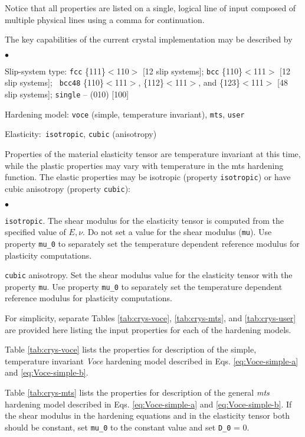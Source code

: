 \documentclass[11pt]{report}
\numberwithin{equation}{section}
\newcommand{\ttt} {\texttt}  %
\newcommand{\ti}{\emph}
\newcommand{\noi}{\noindent}
\newcommand{\squishlist}{
 \begin{list}{$\bullet$}
  { \setlength{\itemsep}{0pt}
     \setlength{\parsep}{3pt}
     \setlength{\topsep}{3pt}
     \setlength{\partopsep}{0pt}
     \setlength{\leftmargin}{1.5em}
     \setlength{\labelwidth}{1em}
     \setlength{\labelsep}{0.5em} } }
\newcommand{\squishend}{
  \end{list}  }
\begin{document}
\noi Notice that all properties are listed on a single, logical line of input composed
of multiple physical lines using a comma for continuation.

\noi The key capabilities of the current crystal implementation may be described by

\small
\squishlist
\item Slip-system type: \ttt{fcc}  \{111\}$<$110$>$ [12 slip systems]; 
 \ttt{bcc} \{110\}$<$111$>$ [12 slip systems];
 \ttt{ bcc48} \{110\}$<$111$>$, \{112\}$<$111$>$, and \{123\}$<$111$>$ [48 slip systems];
    \ttt{single} -- (010) [100] 
\item Hardening model: \ttt{voce} (simple, temperature invariant), \ttt{mts}, \ttt{user}
\item Elasticity:\ttt{ isotropic}, \ttt{cubic} (anisotropy)
\squishend
\normalsize

\noi Properties of the material elasticity tensor are temperature invariant at this time,
while the plastic properties may vary with temperature in the mts hardening function.  
The elastic properties may be isotropic (property \ttt{isotropic})
or have cubic anisotropy (property \ttt{cubic}):
 \small
\squishlist
\item \ttt{isotropic}. The shear modulus for the elasticity 
tensor is computed from the specified value of $E, \nu$. 
Do not  set a value for the shear modulus (\ttt{mu}). Use property \ttt{mu\_0}
to separately set the temperature dependent reference modulus for plasticity 
computations.
\item  \ttt{cubic} anisotropy. Set the shear modulus value for the elasticity 
tensor with the property \ttt{mu}. Use property \ttt{mu\_0}
to separately set the temperature dependent reference modulus for plasticity 
computations.
 \squishend
\normalsize

\noi
For simplicity, separate Tables \ref{tab:crys-voce}, \ref{tab:crys-mts}, and
\ref{tab:crys-user}  are provided here listing the input 
properties for each of the hardening models.

Table \ref{tab:crys-voce} lists the properties for description of the simple, temperature invariant
\ti{Voce} hardening model described in Eqs. \ref{eq:Voce-simple-a} and \ref{eq:Voce-simple-b}.


Table \ref{tab:crys-mts} lists the properties for description of the general \ti{mts} hardening 
model described in Eqs. \ref{eq:Voce-simple-a} and \ref{eq:Voce-simple-b}.
If the shear modulus in the hardening equations and in the elasticity tensor both
should be constant, set \ttt{mu\_0} to the constant value and set \ttt{D\_0} = 0.
\end{document}
